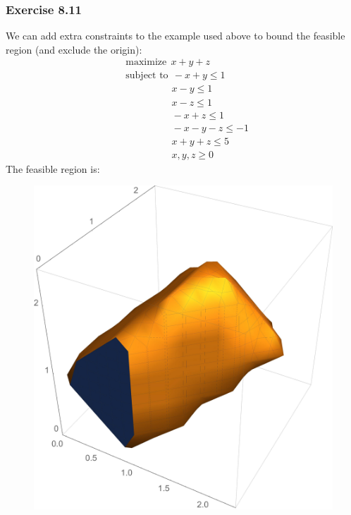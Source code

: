 \documentclass[letterpaper,12pt]{article}
\theoremstyle{definition}
\begin{document}
\subsubsection*{Exercise 8.11}
We can add extra constraints to the example used above to bound the feasible region (and exclude the origin):
\begin{align*}
&\text{maximize} \ \ x + y + z \\
  &\text{subject to} \ \ -x + y \leq 1 \\
  &\qquad \qquad \ \ \ x - y \leq 1 \\
  &\qquad \qquad \ \ \ x - z \leq 1 \\
  &\qquad \qquad \ \ \ -x + z \leq 1 \\
  &\qquad \qquad \ \ \ - x - y - z \leq -1 \\
  &\qquad \qquad \ \ \ x + y + z \leq 5 \\
  &\qquad \qquad \ \ \ x, y ,z \geq 0
\end{align*}
The feasible region is:
\begin{figure}[H]
  \centering
	\begin{center}
		\includegraphics[scale=.6]{exercise11.jpg}
	\end{center}
\end{figure}
\end{document}
